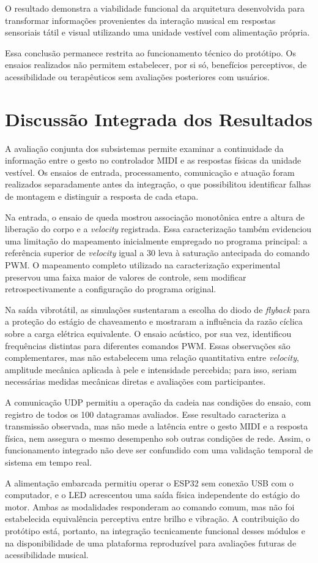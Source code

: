 O resultado demonstra a viabilidade funcional da arquitetura desenvolvida para transformar informações provenientes da interação musical em respostas sensoriais tátil e visual utilizando uma unidade vestível com alimentação própria.

Essa conclusão permanece restrita ao funcionamento técnico do protótipo. Os ensaios realizados não permitem estabelecer, por si só, benefícios perceptivos, de acessibilidade ou terapêuticos sem avaliações posteriores com usuários.


\section{Discussão Integrada dos Resultados}

A avaliação conjunta dos subsistemas permite examinar a continuidade da informação entre o gesto no controlador MIDI e as respostas físicas da unidade vestível. Os ensaios de entrada, processamento, comunicação e atuação foram realizados separadamente antes da integração, o que possibilitou identificar falhas de montagem e distinguir a resposta de cada etapa.

Na entrada, o ensaio de queda mostrou associação monotônica entre a altura de liberação do corpo e a \textit{velocity} registrada. Essa caracterização também evidenciou uma limitação do mapeamento inicialmente empregado no programa principal: a referência superior de \textit{velocity} igual a 30 leva à saturação antecipada do comando PWM. O mapeamento completo utilizado na caracterização experimental preservou uma faixa maior de valores de controle, sem modificar retrospectivamente a configuração do programa original.

Na saída vibrotátil, as simulações sustentaram a escolha do diodo de \textit{flyback} para a proteção do estágio de chaveamento e mostraram a influência da razão cíclica sobre a carga elétrica equivalente. O ensaio acústico, por sua vez, identificou frequências distintas para diferentes comandos PWM. Essas observações são complementares, mas não estabelecem uma relação quantitativa entre \textit{velocity}, amplitude mecânica aplicada à pele e intensidade percebida; para isso, seriam necessárias medidas mecânicas diretas e avaliações com participantes.

A comunicação UDP permitiu a operação da cadeia nas condições do ensaio, com registro de todos os 100 datagramas avaliados. Esse resultado caracteriza a transmissão observada, mas não mede a latência entre o gesto MIDI e a resposta física, nem assegura o mesmo desempenho sob outras condições de rede. Assim, o funcionamento integrado não deve ser confundido com uma validação temporal de sistema em tempo real.

A alimentação embarcada permitiu operar o ESP32 sem conexão USB com o computador, e o LED acrescentou uma saída física independente do estágio do motor. Ambas as modalidades responderam ao comando comum, mas não foi estabelecida equivalência perceptiva entre brilho e vibração. A contribuição do protótipo está, portanto, na integração tecnicamente funcional desses módulos e na disponibilidade de uma plataforma reproduzível para avaliações futuras de acessibilidade musical.


